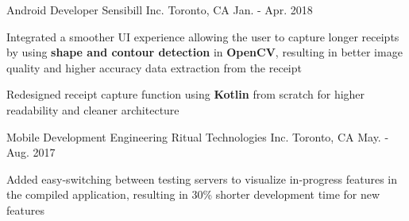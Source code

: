 \begin{cventries}
\cventry
{Android Developer} %
{Sensibill Inc.} %
{Toronto, CA} %
{Jan. - Apr. 2018} %
{ %
\begin{cvitems}
\item {
    Integrated a smoother UI experience allowing 
    the user to capture longer receipts by using 
    \textbf{shape and contour detection} in \textbf{OpenCV}, 
    resulting in better image quality 
    and higher accuracy data extraction from
    the receipt
}
\item {
    Redesigned receipt capture function 
    using \textbf{Kotlin} from scratch 
    for higher readability and cleaner architecture
}
\end{cvitems}
}
\vspace{2mm}

\cventry
{Mobile Development Engineering} %
{Ritual Technologies Inc.} %
{Toronto, CA} %
{May. - Aug. 2017} %
{ %
\begin{cvitems}
\item {
    Added easy-switching between testing servers 
    to visualize in-progress features 
    in the compiled application, 
    resulting in 30\% shorter development time for new features
}
\end{cvitems} 
}


\end{cventries}